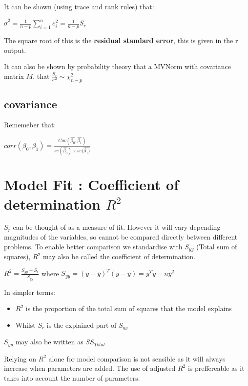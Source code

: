 \documentclass[
  letterpaper,
  DIV=11,
  numbers=noendperiod]{scrreprt}
\providecommand{\tightlist}{%
  \setlength{\itemsep}{0pt}\setlength{\parskip}{0pt}}\usepackage{longtable,booktabs,array}
\begin{document}
It can be shown (using trace and rank rules) that:

\(\hat{\sigma}^2 = \frac{1}{n-p}\sum^n_{i=1}e_i^2 = \frac{1}{n-p}S_r\)

The square root of this is the \textbf{residual standard error}, this is
given in the r output.

It can also be shown by probability theory that a MVNorm with covariance
matrix \(M\), that \(\frac{S_r}{\sigma^2} \sim \chi^2_{n-p}\)

\hypertarget{covariance}{%
\subsection{\texorpdfstring{\hat{\beta}
covariance}{ covariance}}\label{covariance}}

Rememeber that:

\(corr(\beta_0, \beta_1) = \frac{Cov(\hat{\beta_0},\hat{\beta_1})}{se(\hat{\beta_0}) \times se(\hat{\beta_1)}}\)

\hypertarget{model-fit-coefficient-of-determination-r2}{%
\section{\texorpdfstring{Model Fit : Coefficient of determination
\(R^2\)}{Model Fit : Coefficient of determination R\^{}2}}\label{model-fit-coefficient-of-determination-r2}}

\(S_r\) can be thought of as a measure of fit. However it will vary
depending magnitudes of the variables, so cannot be compared directly
between different problems. To enable better comparison we standardise
with \(S_{yy}\) (Total sum of squares), \(R^2\) may also be called the
coefficient of determination.

\(R^2 = \frac{S_{yy} - S_r}{S_{yy}}\) where
\(S_{yy} = (y-\bar{y})^T(y-\bar{y}) = y^Ty - n\bar{y}^2\)

In simpler terms:

\begin{itemize}
\tightlist
\item
  \(R^2\) is the proportion of the total sum of squares that the model
  explains
\item
  Whilst \(S_r\) is the explained part of \(S_{yy}\)
\end{itemize}

\(S_{yy}\) may also be written as \(SS_{Total}\)

Relying on \(R^2\) alone for model comparison is not sensible as it will
always increase when parameters are added. The use of adjusted \(R^2\)
is preffereable as it takes into account the number of parameters.
\end{document}
